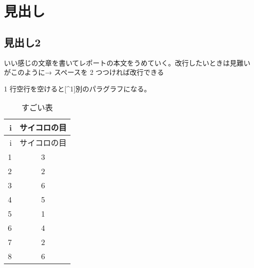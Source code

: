 \hypertarget{ux898bux51faux3057}{%
\section{見出し}\label{ux898bux51faux3057}}

\hypertarget{ux898bux51faux30572}{%
\subsection{見出し2}\label{ux898bux51faux30572}}

いい感じの文章を書いてレポートの本文をうめていく。改行したいときは見難いがこのように→
スペースを 2 つつければ改行できる

1 行空行を空けると{[}\^{}1{]}別のパラグラフになる。

\hypertarget{tbl:table}{}
\begin{longtable}[]{@{}rc@{}}
\caption{\label{tbl:table}すごい表}\tabularnewline
\toprule
i & サイコロの目\tabularnewline
\midrule
\endfirsthead
\toprule
i & サイコロの目\tabularnewline
\midrule
\endhead
1 & 3\tabularnewline
2 & 2\tabularnewline
3 & 6\tabularnewline
4 & 5\tabularnewline
5 & 1\tabularnewline
6 & 4\tabularnewline
7 & 2\tabularnewline
8 & 6\tabularnewline
\bottomrule
\end{longtable}

